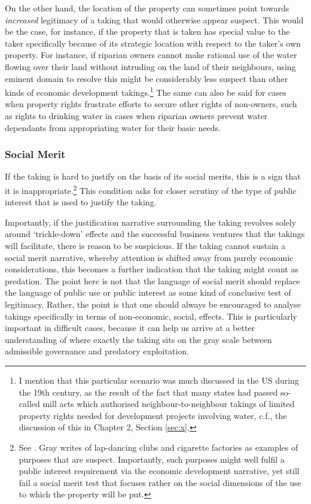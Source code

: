 On the other hand, the location of the property can sometimes point towards {\it increased} legitimacy of a taking that would otherwise appear suspect. This would be the case, for instance, if the property that is taken has special value to the taker specifically because of its strategic location with respect to the taker's own property. For instance, if riparian owners cannot make rational use of the water flowing over their land without intruding on the land of their neighbours, using eminent domain to resolve this might be considerably less suspect than other kinds of economic development takings.\footnote{I mention that this particular scenario was much discussed in the US during the 19th century, as the result of the fact that many states had passed so-called mill acts which authorised neighbour-to-neighbour takings of limited property rights needed for development projects involving water, c.f., the discussion of this in Chapter 2, Section \ref{sec:x}.} The same can also be said for cases when property rights frustrate efforts to secure other rights of non-owners, such as rights to drinking water in cases when riparian owners prevent water dependants from appropriating water for their basic needs.

\subsubsection*{Social Merit}

If the taking is hard to justify on the basis of its social merits, this is a sign that it is inappropriate.\footnote{See \cite[34]{gray11}. Gray writes of lap-dancing clubs and cigarette factories as examples of purposes that are suspect. Importantly, such purposes might well fulfil a public interest requirement via the economic development narrative, yet still fail a social merit test that focuses rather on the social dimensions of the use to which the property will be put.} This condition asks for closer scrutiny of the type of public interest that is used to justify the taking.

Importantly, if the justification narrative surrounding the taking revolves solely around `trickle-down' effects and the successful business ventures that the takings will facilitate, there is reason to be suspicious. If the taking cannot sustain a social merit narrative, whereby attention is shifted away from purely economic considerations, this becomes a further indication that the taking might count as predation. The point here is not that the language of social merit should replace the language of public use or public interest as some kind of conclusive test of legitimacy. Rather, the point is that one should always be encouraged to analyse takings specifically in terms of non-economic, social, effects. This is particularly important in difficult cases, because it can help us arrive at a better understanding of where exactly the taking sits on the gray scale between admissible governance and predatory exploitation. 

